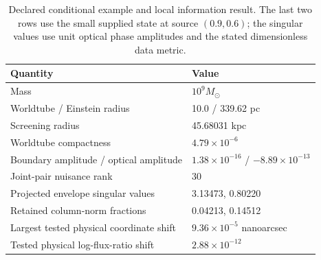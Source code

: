 \begin{table}[t]
\centering\small
\caption{Declared conditional example and local information result. The last
two rows use the small supplied state at source $(0.9,0.6)$; the singular
values use unit optical phase amplitudes and the stated dimensionless data metric.}
\begin{tabular}{p{.49\linewidth}p{.42\linewidth}}
\toprule Quantity & Value\\\midrule
Mass & $10^9M_\odot$\\
Worldtube / Einstein radius & 10.0 / 339.62 pc\\
Screening radius & 45.68031 kpc\\
Worldtube compactness & $4.79\times10^{-6}$\\
Boundary amplitude / optical amplitude & $1.38\times10^{-16}$ / $-8.89\times10^{-13}$\\
Joint-pair nuisance rank & 30\\
Projected envelope singular values & 3.13473, 0.80220\\
Retained column-norm fractions & 0.04213, 0.14512\\
Largest tested physical coordinate shift & $9.36\times10^{-5}$ nanoarcsec\\
Tested physical log-flux-ratio shift & $2.88\times10^{-12}$\\
\bottomrule\end{tabular}\label{tab:numeric}\end{table}
